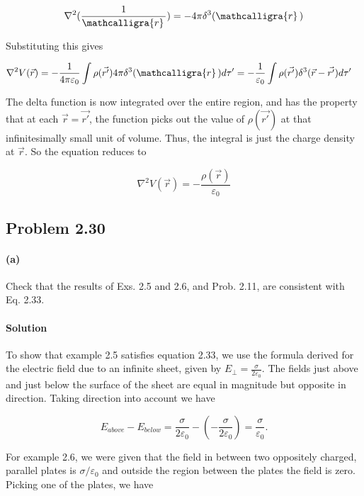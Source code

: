 \documentclass{article}
\newcommand{\scriptr}{\mathcalligra{r}\,}
\begin{document}
\begin{align*}
    \nabla^2(\dfrac{1}{\scriptr}) = -4\pi \delta^3(\scriptr)
\end{align*}

Substituting this gives 

\begin{align*}
    \nabla^2 V(\vec{r}) &= -\frac{1}{4\pi\varepsilon_0} \int \rho(\vec{r'})4\pi \delta^3(\scriptr)d \tau ' = -\frac{1}{\varepsilon_0} \int \rho(\vec{r'})\delta^3(\vec{r} - \vec{r'}) d\tau '
\end{align*}

The delta function is now integrated over the entire region, and has the property that at each $\vec{r} = \vec{r'}$, the function picks out the value of $\rho(\vec{r'})$ at that infinitesimally small unit of volume. Thus, the integral is just the charge density at $\vec{r}$.  So the equation reduces to 

$$
\nabla^2 V(\vec{r}) = -\frac{\rho(\vec{r})}{\varepsilon_0}
$$

\newpage

\subsection*{Problem 2.30}
\paragraph{(a)} Check that the results of Exs. 2.5 and 2.6, and Prob. 2.11, are consistent with Eq. 2.33.

\paragraph{Solution} To show that example 2.5 satisfies equation 2.33, we use the formula derived for the electric field due to an infinite sheet, given by $E_{\perp} = \frac{\sigma}{2\varepsilon_0}$. The fields just above and just below the surface of the sheet are equal in magnitude but opposite in direction. Taking direction into account we have 

$$
E_{above} - E_{below} = \frac{\sigma}{2\varepsilon_0} - \left(-\frac{\sigma}{2\varepsilon_0}\right) = \frac{\sigma}{\varepsilon_0}.
$$

For example 2.6, we were given that the field in between two oppositely charged, parallel plates is $\sigma/\varepsilon_0$ and outside the region between the plates the field is zero. Picking one of the plates, we have 
\end{document}
